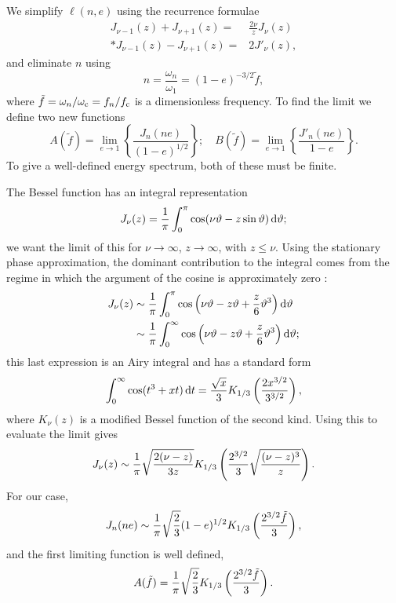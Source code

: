 We simplify $\ell(n,e)$ using the recurrence formulae \citep[section 2.12]{Watson1995}
\begin{align}
J_{\nu-1}(z) + J_{\nu+1}(z)  = {} & \frac{2\nu}{z}J_\nu(z)\\*
J_{\nu-1}(z) - J_{\nu+1}(z)  = {} & 2J'_\nu(z),\label{eq:J_derivative}
\end{align}
and eliminate $n$ using
\begin{equation}
n = \frac{\omega_n}{\omega_1} = (1-e)^{-3/2}\tilde{f},
\end{equation}
where $\tilde{f} = \omega_n/\omega_\mathrm{c} = f_n/f_\mathrm{c}$ is a dimensionless frequency. To find the limit we define two new functions \citep{Berry2010}
\begin{equation}
A(\tilde{f}) = \lim_{e\rightarrow 1}\left\{\frac{J_n(ne)}{(1-e)^{1/2}}\right\}; \quad B(\tilde{f}) = \lim_{e\rightarrow 1}\left\{\frac{J'_n(ne)}{1-e}\right\}.
\end{equation}
To give a well-defined energy spectrum, both of these must be finite.

The Bessel function has an integral representation
\begin{equation}
J_\nu(z) = \frac{1}{\pi}\int_{0}^{\pi}{\cos(\nu\vartheta - z\sin\vartheta)}\,\mathrm{d}{\vartheta};
\end{equation}
we want the limit of this for $\nu \rightarrow \infty$, $z \rightarrow \infty$, with $z \leq \nu$. Using the stationary phase approximation, the dominant contribution to the integral comes from the regime in which the argument of the cosine is approximately zero \citep[sections 8.2, 8.43]{Watson1995}:
\begin{align}
J_\nu(z)  \sim {} & \frac{1}{\pi}\int_{0}^{\pi}{\cos\left(\nu\vartheta - z\vartheta + \frac{z}{6}\vartheta^3\right)}\,\mathrm{d}{\vartheta}\\*
  \sim {} & \frac{1}{\pi}\int_{0}^{\infty}{\cos\left(\nu\vartheta - z\vartheta + \frac{z}{6}\vartheta^3\right)}\,\mathrm{d}{\vartheta};
\end{align}
this last expression is an Airy integral and has a standard form \citep[section 6.4]{Watson1995}
\begin{equation}
\int_{0}^{\infty}{\cos(t^3 + xt)}\,\mathrm{d}{t} = \frac{\sqrt{x}}{3}K_{1/3}\left(\frac{2x^{3/2}}{3^{3/2}}\right),
\end{equation}
where $K_\nu(z)$ is a modified Bessel function of the second kind. Using this to evaluate the limit gives
\begin{equation}
J_\nu(z) \sim \frac{1}{\pi}\sqrt{\frac{2(\nu - z)}{3z}}K_{1/3}\left(\frac{2^{3/2}}{3}\sqrt{\frac{(\nu -z)^3}{z}}\right).
\label{eq:J_nu}
\end{equation}
For our case,
\begin{equation}
J_n(ne) \sim \frac{1}{\pi}\sqrt{\frac{2}{3}}(1-e)^{1/2}K_{1/3}\left(\frac{2^{3/2}\tilde{f}}{3}\right),
\end{equation}
and the first limiting function is well defined,
\begin{equation}
A(\tilde{f}) = \frac{1}{\pi}\sqrt{\frac{2}{3}}K_{1/3}\left(\frac{2^{3/2}\tilde{f}}{3}\right).
\end{equation}


